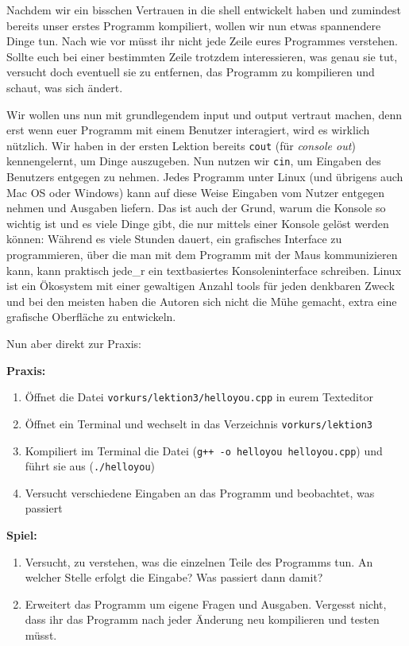 
Nachdem wir ein bisschen Vertrauen in die shell entwickelt haben und zumindest
bereits unser erstes Programm kompiliert, wollen wir nun etwas spannendere
Dinge tun. Nach wie vor müsst ihr nicht jede Zeile eures Programmes verstehen.
Sollte euch bei einer bestimmten Zeile trotzdem interessieren, was genau sie
tut, versucht doch eventuell sie zu entfernen, das Programm zu kompilieren und
schaut, was sich ändert.

Wir wollen uns nun mit grundlegendem input und output vertraut machen, denn
erst wenn euer Programm mit einem Benutzer interagiert, wird es wirklich
nützlich. Wir haben in der ersten Lektion bereits \texttt{cout} (für
\emph{console out}) kennengelernt, um Dinge auszugeben. Nun nutzen wir
\texttt{cin}, um Eingaben des Benutzers entgegen zu nehmen.
Jedes Programm unter Linux (und übrigens auch Mac OS oder Windows) kann auf
diese Weise Eingaben vom Nutzer entgegen nehmen und Ausgaben liefern. Das ist
auch der Grund, warum die Konsole so wichtig ist und es viele Dinge gibt, die
nur mittels einer Konsole gelöst werden können: Während es viele Stunden
dauert, ein grafisches Interface zu programmieren, über die man mit dem
Programm mit der Maus kommunizieren kann, kann praktisch jede\_r ein
textbasiertes Konsoleninterface schreiben. Linux ist ein Ökosystem mit einer
gewaltigen Anzahl tools für jeden denkbaren Zweck und bei den meisten haben die
Autoren sich nicht die Mühe gemacht, extra eine grafische Oberfläche zu
entwickeln.

Nun aber direkt zur Praxis:

\textbf{Praxis:}
\begin{enumerate}
    \item Öffnet die Datei \texttt{vorkurs/lektion3/helloyou.cpp} in eurem Texteditor
    \item Öffnet ein Terminal und wechselt in das Verzeichnis \texttt{vorkurs/lektion3}
    \item Kompiliert im Terminal die Datei (\texttt{g++ -o helloyou
        helloyou.cpp}) und führt sie aus (\texttt{./helloyou})
    \item Versucht verschiedene Eingaben an das Programm und beobachtet, was passiert
\end{enumerate}


\textbf{Spiel:}

\begin{enumerate}
    \item Versucht, zu verstehen, was die einzelnen Teile des Programms tun. An
        welcher Stelle erfolgt die Eingabe? Was passiert dann damit?
    \item Erweitert das Programm um eigene Fragen und Ausgaben. Vergesst nicht,
        dass ihr das Programm nach jeder Änderung neu kompilieren und testen
        müsst.
\end{enumerate}
